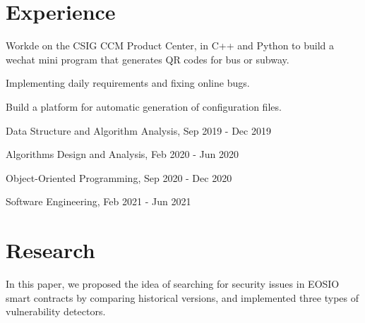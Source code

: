 \documentclass[]{resume}
\begin{document}
\begin{minipage}[t]{0.66\textwidth} 


\section{Experience}

\vspace{\topsep} %
\begin{tightemize}
\item Workde on the CSIG CCM Product Center, in C++ and Python to build a wechat mini program that generates QR codes for bus or subway.
\item Implementing daily requirements and fixing online bugs.
\item Build a platform for automatic generation of configuration files.
\end{tightemize}
\sectionsep

\begin{tightemize}
\item Data Structure and Algorithm Analysis, Sep 2019 - Dec 2019
\item Algorithms Design and Analysis, Feb 2020 - Jun 2020
\item Object-Oriented Programming, Sep 2020 - Dec 2020
\item Software Engineering, Feb 2021 - Jun 2021
\end{tightemize}
\sectionsep



\section{Research}

In this paper, we proposed the idea of searching for security issues in EOSIO smart contracts by comparing historical versions, and implemented three types of vulnerability detectors.
\sectionsep


\end{minipage}
\end{document}
